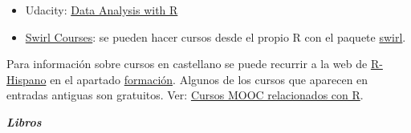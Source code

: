 \documentclass[]{book}
\providecommand{\tightlist}{%
  \setlength{\itemsep}{0pt}\setlength{\parskip}{0pt}}
\begin{document}
\begin{itemize}
\tightlist
\item
  Udacity:
  \href{https://eu.udacity.com/course/data-analysis-with-r--ud651}{Data
  Analysis with R}
\end{itemize}

\begin{itemize}
\tightlist
\item
  \href{https://swirlstats.com/scn/title.html}{Swirl Courses}: se pueden
  hacer cursos desde el propio R con el paquete
  \href{https://swirlstats.com}{swirl}.
\end{itemize}

Para información sobre cursos en castellano se puede recurrir a la web
de \href{http://r-es.org/}{R-Hispano} en el apartado
\href{http://r-es.org/category/formacion}{formación}. Algunos de los
cursos que aparecen en entradas antiguas son gratuitos. Ver:
\href{http://r-es.org/2016/02/12/cursos-masivos-y-otra-formacion-on-line-sobre-r/}{Cursos
MOOC relacionados con R}.

\textbf{\emph{Libros}}
\end{document}
